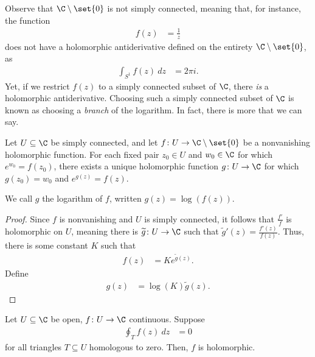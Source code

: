 \documentclass[10pt]{mypackage}
\begin{document}
Observe that $\C\setminus \set{0}$ is not simply connected, meaning that, for instance, the function
\begin{align*}
  f(z) &= \frac{1}{z}
\end{align*}
does not have a holomorphic antiderivative defined on the entirety $\C\setminus \set{0}$, as
\begin{align*}
  \int_{S^1}^{} f(z)\:dz &= 2\pi i.
\end{align*}
Yet, if we restrict $f(z)$ to a simply connected subset of $\C$, there \textit{is} a holomorphic antiderivative. Choosing such a simply connected subset of $\C$ is known as choosing a \textit{branch} of the logarithm. In fact, there is more that we can say.
\begin{corollary}
  Let $U\subseteq \C$ be simply connected, and let $f\colon U\rightarrow \C\setminus \set{0}$ be a nonvanishing holomorphic function. For each fixed pair $z_0\in U$ and $w_0\in \C$ for which $e^{w_0} = f\left( z_0 \right)$, there exists a unique holomorphic function $g\colon U\rightarrow \C$ for which $g\left(z_0\right) = w_0$ and $e^{g(z)} = f(z)$.\newline

  We call $g$ the logarithm of $f$, written $g(z) = \log\left( f(z) \right)$.
\end{corollary}
\begin{proof}
  Since $f$ is nonvanishing and $U$ is simply connected, it follows that $\frac{f'}{f}$ is holomorphic on $U$, meaning there is $ \widetilde{g}\colon U\rightarrow \C $ such that $\widetilde{g}'(z) = \frac{f'(z)}{f(z)}$. Thus, there is some constant $K$ such that
  \begin{align*}
    f(z) &= Ke^{\widetilde{g}(z)}.
  \end{align*}
  Define
  \begin{align*}
    g(z) &= \log(K) \widetilde{g}(z).
  \end{align*}
\end{proof}
\begin{theorem}
  Let $U\subseteq \C$ be open, $f\colon U\rightarrow \C$ continuous. Suppose
  \begin{align*}
    \oint_{T}^{} f(z)\:dz &= 0
  \end{align*}
  for all triangles $T\subseteq U$ homologous to zero. Then, $f$ is holomorphic.
\end{theorem}
\end{document}
